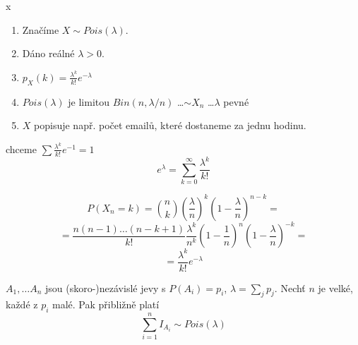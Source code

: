 \documentclass[../main.tex]{subfiles}
\begin{document}
\begin{definition} {\color{white} x}

    \begin{enumerate}
        \item Značíme $X \sim Pois(\lambda)$.
        \item Dáno reálné $\lambda > 0$.
        \item $p_X(k) = \frac{\lambda^k}{k!}e^{-\lambda}$
        \item $Pois(\lambda)$ je limitou $Bin(n,\lambda/n)$ \dots $\sim X_n$ \dots $\lambda$ pevné
        \item $X$ popisuje např. počet emailů, které dostaneme za jednu hodinu.
    \end{enumerate}

    chceme $\sum \frac{\lambda^k}{k!}e^{-1} = 1$
    \[e^\lambda =  \sum^\infty_{k=0} \frac{\lambda^k}{k!}\]

    \[P(X_n = k) = \binom{n}{k}\left(\frac{\lambda}{n}\right)^k\left(1-\frac{\lambda}{n}\right)^{n-k} =\]
    \[=\frac{n(n-1)\dots (n-k+1)}{k!} \frac{\lambda^k}{n^k} \left(1-\frac{1}{n}\right)^n \left(1-\frac{\lambda}{n}\right)^{-k}=\]
    \[ = \frac{\lambda^k}{k!}e^{-\lambda}\]
\end{definition}

\begin{remark}

    $A_1,\dots A_n$ jsou (skoro-)nezávislé jevy s $P(A_i) = p_i$,
    $\lambda = \sum_j p_j$. Nechť $n$ je velké, každé z $p_i$ malé. Pak přibližně platí
    \[\sum^n_{i=1}I_{A_i} \sim Pois(\lambda)\]
\end{remark}
\end{document}
